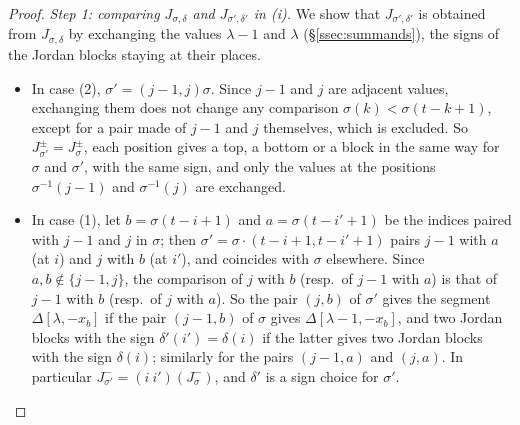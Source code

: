 \documentclass[a4paper,12pt,leqno]{amsart}
\theoremstyle{plain}
\theoremstyle{definition}
\begin{document}
\begin{proof}
\emph{Step 1: comparing $J_{\sigma,\delta}$ and $J_{\sigma',\delta'}$ in (i).} We show that
$J_{\sigma',\delta'}$ is obtained from $J_{\sigma,\delta}$ by exchanging the values $\lambda-1$ and $\lambda$
(\S\ref{ssec:summands}), the signs of the Jordan blocks staying at their places.
\begin{itemize}
\item In case (2), $\sigma'=(j-1,j)\sigma$. Since $j-1$ and $j$ are adjacent values, exchanging them does
not change any comparison $\sigma(k)<\sigma(t-k+1)$, except for a pair made of $j-1$ and $j$ themselves,
which is excluded. So $J^\pm_{\sigma'}=J^\pm_\sigma$, each position gives a top, a bottom or a block in the
same way for $\sigma$ and $\sigma'$, with the same sign, and only the values at the positions
$\sigma^{-1}(j-1)$ and $\sigma^{-1}(j)$ are exchanged.
\item In case (1), let $b=\sigma(t-i+1)$ and $a=\sigma(t-i'+1)$ be the indices paired with $j-1$ and $j$ in
$\sigma$; then $\sigma'=\sigma\cdot(t-i+1,t-i'+1)$ pairs $j-1$ with $a$ (at $i$) and $j$ with $b$ (at
$i'$), and coincides with $\sigma$ elsewhere. Since $a,b\notin\{j-1,j\}$, the comparison of $j$ with $b$
(resp.\ of $j-1$ with $a$) is that of $j-1$ with $b$ (resp.\ of $j$ with $a$). So the pair $(j,b)$ of
$\sigma'$ gives the segment $\Delta[\lambda,-x_b]$ if the pair $(j-1,b)$ of $\sigma$ gives
$\Delta[\lambda-1,-x_b]$, and two Jordan blocks with the sign $\delta'(i')=\delta(i)$ if the latter gives two
Jordan blocks with the sign $\delta(i)$; similarly for the pairs $(j-1,a)$ and $(j,a)$. In particular
$J^-_{\sigma'}=(i\ i')(J^-_\sigma)$, and $\delta'$ is a sign choice for $\sigma'$.
\end{itemize}


\end{proof}
\end{document}
